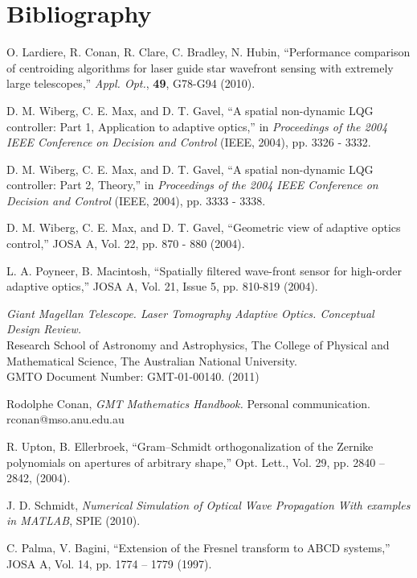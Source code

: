 
\newpage
\section{Bibliography}
\label{sec:biblio}

\begin{thebibliography}{}

O. Lardiere, R. Conan, R. Clare, C. Bradley, N. Hubin,
``Performance comparison of centroiding algorithms for laser guide star
wavefront sensing with extremely large telescopes,'' \emph{Appl. Opt.},
\textbf{49}, G78-G94 (2010).

D. M. Wiberg, C. E. Max, and D. T. Gavel, ``A spatial
non-dynamic LQG controller: Part 1, Application to
adaptive optics,'' in \emph{Proceedings of the 2004 IEEE
Conference on Decision and Control} (IEEE, 2004), pp.
3326 - 3332.

D. M. Wiberg, C. E. Max, and D. T. Gavel, ``A spatial
non-dynamic LQG controller: Part 2, Theory,'' in
\emph{Proceedings of the 2004 IEEE Conference on Decision and
Control} (IEEE, 2004), pp. 3333 - 3338.

D. M. Wiberg, C. E. Max, and D. T. Gavel, ``Geometric view of adaptive optics
control,'' JOSA A, Vol. 22, pp. 870 - 880 (2004).

L. A. Poyneer, B. Macintosh,
``Spatially filtered wave-front sensor for high-order adaptive optics,''
JOSA A, Vol. 21, Issue 5, pp. 810-819 (2004).

\emph{Giant Magellan Telescope. Laser Tomography Adaptive Optics. Conceptual
Design Review.} \\
Research School of Astronomy and Astrophysics, The College of
Physical and Mathematical Science, The Australian National University. \\
GMTO Document Number: GMT-01-00140. (2011)

Rodolphe Conan, \emph{GMT Mathematics Handbook.} Personal communication. \\
rconan@mso.anu.edu.au

R. Upton, B. Ellerbroek,
``Gram–Schmidt orthogonalization of the Zernike polynomials
on apertures of arbitrary shape,''
Opt. Lett., Vol. 29, pp. 2840 -- 2842, (2004).

J. D. Schmidt, \emph{Numerical Simulation of Optical Wave Propagation With examples in MATLAB}, SPIE (2010).

C. Palma, V. Bagini, ``Extension of the Fresnel transform to ABCD
systems,'' JOSA A, Vol. 14, pp. 1774 -- 1779 (1997).


\end{thebibliography}
